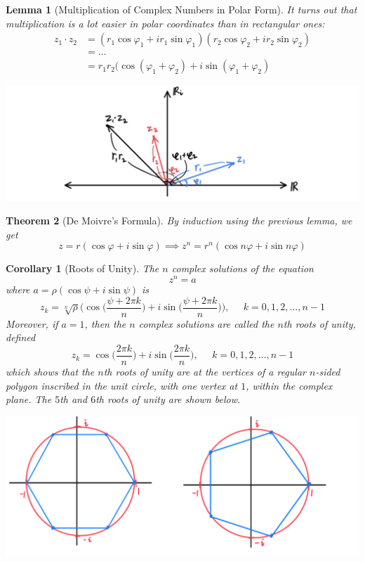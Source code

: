 \documentclass{article}
\newtheorem{theorem}{Theorem}[section]
\newtheorem{lemma}[theorem]{Lemma}
\newtheorem{corollary}{Corollary}[theorem]
\theoremstyle{remark}
\theoremstyle{definition}
\begin{document}
\begin{lemma}[Multiplication of Complex Numbers in Polar Form]
It turns out that multiplication is a lot easier in polar coordinates than in rectangular ones: 
\begin{align*}
    z_1 \cdot z_2 & = (r_1 \cos{\varphi_1} + i r_1 \sin{\varphi_1})(r_2 \cos{\varphi_2} + i r_2 \sin{\varphi_2}) \\
    & = \ldots \\
    & = r_1 r_2 \big(\cos{(\varphi_1 + \varphi_2)} + i \sin{(\varphi_1 + \varphi_2)}
\end{align*}
\begin{center}
    \includegraphics[scale=0.3]{img/Multiplication_Complex_Polar_Form.jpg}
\end{center}
\end{lemma}

\begin{theorem}[De Moivre's Formula]
By induction using the previous lemma, we get 
\[z = r ( \cos{\varphi} + i \sin{\varphi}) \implies z^n = r^n (\cos{n\varphi} + i \sin{n \varphi})\]
\end{theorem}

\begin{corollary}[Roots of Unity]
The $n$ complex solutions of the equation 
\[z^n = a\]
where $a = \rho (\cos{\psi} + i \sin{\psi})$ is 
\[z_k = \sqrt[n]{\rho} \bigg( \cos\Big(\frac{\psi + 2\pi k}{n} \Big) + i \sin\Big(\frac{\psi + 2\pi k}{n}\Big) \bigg), \;\;\;\;\; k = 0, 1, 2, \ldots, n-1\]
Moreover, if $a = 1$, then the $n$ complex solutions are called the \textit{$n$th roots of unity}, defined
\[z_k = \cos\Big(\frac{2\pi k}{n}\Big) + i \sin\Big(\frac{2\pi k}{n}\Big), \;\;\;\;\; k = 0, 1, 2, \ldots, n-1\]
which shows that the $n$th roots of unity are at the vertices of a regular $n$-sided polygon inscribed in the unit circle, with one vertex at $1$, within the complex plane. The $5$th and $6$th roots of unity are shown below. 
\begin{center}
    \includegraphics[scale=0.27]{img/5th_6th_Roots_of_Unity.PNG}
\end{center}
\end{corollary}
\end{document}
